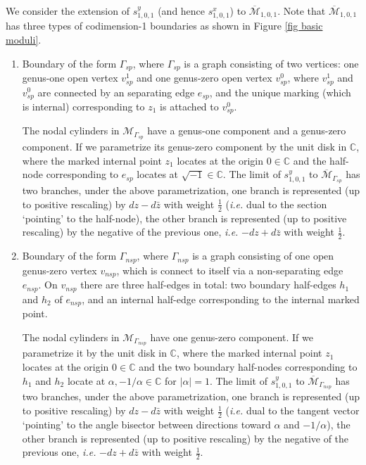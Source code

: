 \documentclass[11pt]{amsart}
\theoremstyle{definition}
\theoremstyle{remark}
\newcommand{\<}{\left<}
\renewcommand{\>}{\right>}
\numberwithin{equation}{section}
\def\Mbar{{\overline{\mathcal M}}}
\begin{document}
We consider the extension of  $s^y_{1,0,1}$ (and hence $s^x_{1,0,1}$) to $\Mbar_{1,0,1}$. Note that $\Mbar_{1,0,1}$ has three types of codimension-1 boundaries as shown in Figure \ref{fig basic moduli}.
\begin{enumerate}
    \item Boundary of the form $\Gamma_{sp}$, where $\Gamma_{sp}$ is a graph consisting of two vertices: one genus-one open vertex $v_{sp}^1$ and one genus-zero open vertex $v_{sp}^0$, where $v_{sp}^1$ and $v_{sp}^0$ are connected by an separating edge $e_{sp}$, and the unique marking (which is internal) corresponding to $z_1$ is attached to $v_{sp}^0$.

    The nodal cylinders in $\mathcal M_{\Gamma_{sp}}$ have a genus-one component and a genus-zero component. If we parametrize its genus-zero component by the unit disk in $\mathbb C$, where the marked internal point $z_1$ locates at the origin $0\in \mathbb C$ and the half-node corresponding to $e_{sp}$ locates at $\sqrt{-1}\in \mathbb C$. The limit of $s^y_{1,0,1}$ to $\Mbar_{\Gamma_{sp}}$ has two branches, under the above parametrization, one branch is represented (up to positive rescaling) by $dz-d\bar z$ with weight $\frac{1}{2}$ (\textit{i.e.} dual to the section `pointing' to the half-node), the other branch is represented (up to positive rescaling) by the negative of the previous one, \textit{i.e.} $-dz+d\bar z$ with weight $\frac{1}{2}$.
    
     \item Boundary of the form $\Gamma_{nsp}$, where $\Gamma_{nsp}$ is a graph consisting of one open genus-zero vertex $v_{nsp}$, which is connect to itself via a non-separating edge $e_{nsp}$. On $v_{nsp}$ there are three half-edges in total: two boundary half-edges $h_1$ and $h_2$ of $e_{nsp}$, and an internal half-edge corresponding to the internal marked point.

      The nodal cylinders in $\mathcal M_{\Gamma_{nsp}}$ have one genus-zero component. If we parametrize it by the unit disk in $\mathbb C$, where the marked internal point $z_1$ locates at the origin $0\in \mathbb C$ and the two boundary half-nodes corresponding to $h_1$ and $h_2$ locate at $\alpha,-1/\alpha\in \mathbb C$ for $\lvert \alpha\rvert=1$. The limit of $s^y_{1,0,1}$ to $\Mbar_{\Gamma_{nsp}}$ has two branches, under the above parametrization, one branch is represented (up to positive rescaling) by $dz-d\bar z$ with weight $\frac{1}{2}$ (\textit{i.e.} dual to the tangent vector `pointing' to the angle bisector between directions toward $\alpha$ and $-1/\alpha$), the other branch is represented (up to positive rescaling) by the negative of the previous one, \textit{i.e.} $-dz+d\bar z$ with weight $\frac{1}{2}$.
      

\end{enumerate}
\end{document}
